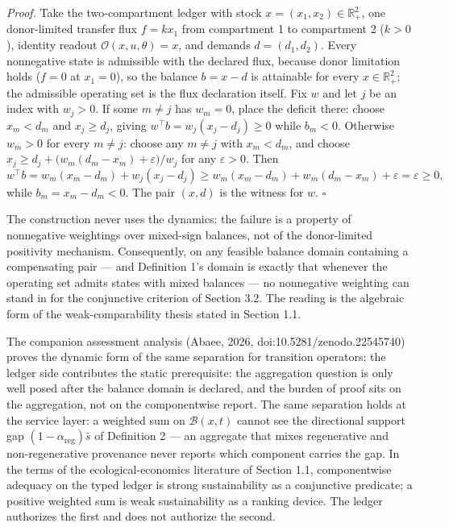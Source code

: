 \documentclass[11pt]{article}
\begin{document}
\emph{Proof.} Take the two-compartment ledger with stock
\(x = (x_1, x_2) \in \mathbb{R}^2_+\), one donor-limited transfer flux
\(f = kx_1\) from compartment 1 to compartment 2 (\(k > 0\)), identity
readout \(\mathcal{O}(x, u, \theta) = x\), and demands
\(d = (d_1, d_2)\). Every nonnegative state is admissible with the
declared flux, because donor limitation holds (\(f = 0\) at
\(x_1 = 0\)), so the balance \(b = x - d\) is attainable for every
\(x \in \mathbb{R}^2_+\); the admissible operating set is the flux
declaration itself. Fix \(w\) and let \(j\) be an index with
\(w_j > 0\). If some \(m \neq j\) has \(w_m = 0\), place the deficit
there: choose \(x_m < d_m\) and \(x_j \ge d_j\), giving
\(w^\top b = w_j (x_j - d_j) \ge 0\) while \(b_m < 0\). Otherwise
\(w_m > 0\) for every \(m \neq j\): choose any \(m \neq j\) with
\(x_m < d_m\), and choose
\(x_j \ge d_j + \bigl( w_m (d_m - x_m) + \varepsilon \bigr)/w_j\) for
any \(\varepsilon > 0\). Then
\[w^\top b = w_m (x_m - d_m) + w_j (x_j - d_j) \ge w_m (x_m - d_m) + w_m (d_m - x_m) + \varepsilon = \varepsilon \ge 0,\]
while \(b_m = x_m - d_m < 0\). The pair \((x, d)\) is the witness for
\(w\). \ensuremath{\square}

The construction never uses the dynamics: the failure is a property of
nonnegative weightings over mixed-sign balances, not of the
donor-limited positivity mechanism. Consequently, on any feasible
balance domain containing a compensating pair --- and Definition 1's
domain is exactly that whenever the operating set admits states with
mixed balances --- no nonnegative weighting can stand in for the
conjunctive criterion of Section 3.2. The reading is the algebraic form
of the weak-comparability thesis stated in Section 1.1.

The companion assessment analysis (Abaee, 2026, doi:10.5281/zenodo.22545740) proves
the dynamic form of the same separation for transition operators; the
ledger side contributes the static prerequisite: the aggregation
question is only well posed after the balance domain is declared, and
the burden of proof sits on the aggregation, not on the componentwise
report. The same separation holds at the service layer: a weighted sum
on \(\mathcal{B}(x,t)\) cannot see the directional support gap
\((1 - \alpha_{\mathrm{reg}})\bar s\) of Definition 2 --- an aggregate
that mixes regenerative and non-regenerative provenance never reports
which component carries the gap. In the terms of the
ecological-economics literature of Section 1.1, componentwise adequacy
on the typed ledger is strong sustainability as a conjunctive predicate;
a positive weighted sum is weak sustainability as a ranking device. The
ledger authorizes the first and does not authorize the second.
\end{document}

